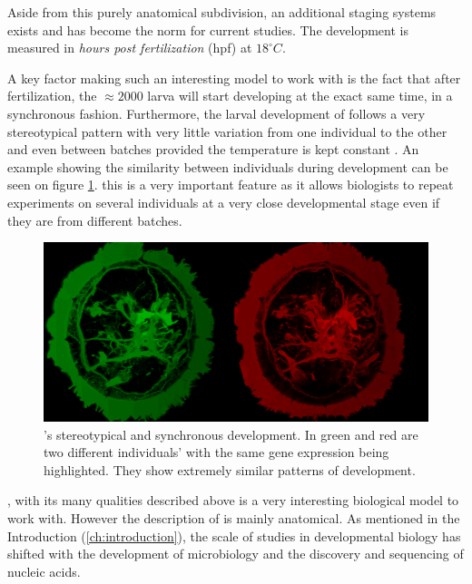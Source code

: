     Aside from this purely anatomical subdivision, an additional staging systems exists and has become the norm for current studies. The development is measured in \textit{hours post fertilization} (hpf) at $18^{\circ}C$.
    
    A key factor making \platy{} such an interesting model to work with is the fact that after fertilization, the $\approx 2000$ larva will start developing at the exact same time, in a synchronous fashion. Furthermore, the larval development of \platy{} follows a very stereotypical pattern with very little variation from one individual to the other and even between batches provided the temperature is kept constant \cite{fischer04,dorresteijn90}. An example showing the similarity between individuals during development can be seen on figure \ref{fig:brain_comparison}. this is a very important feature as it allows biologists to repeat experiments on several individuals at a very close developmental stage even if they are from different batches.\\
    
\begin{figure}[bth]
  \includegraphics[width=\linewidth]{gfx/chapter1/brain_comparison.png}
  \caption{\platyfull{}'s stereotypical and synchronous development. In green and red are two different \platy{} individuals' with the same gene expression being highlighted. They show extremely similar patterns of development.}
  \label{fig:brain_comparison}
\end{figure}

	\platy{}, with its many qualities described above is a very interesting biological model to work with. However the description of \platy{} is mainly anatomical. As mentioned in the Introduction (\ref{ch:introduction}), the scale of studies in developmental biology has shifted with the development of microbiology and the discovery and sequencing of nucleic acids.

